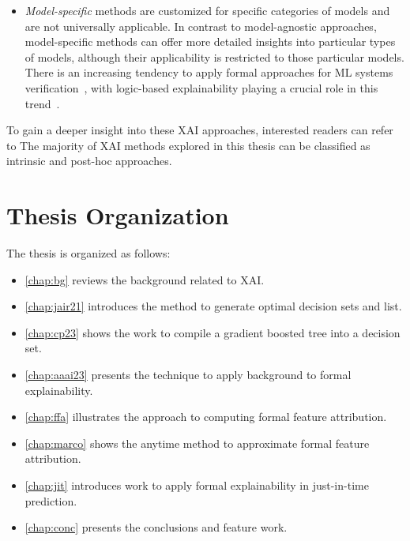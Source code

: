 \begin{itemize}
\begin{itemize}
	
	\item \emph{Model-specific} methods are customized for specific categories of models
		and are not universally applicable.
		In contrast to model-agnostic approaches, model-specific methods can offer more
		detailed insights into particular types of models, although their applicability is 
		restricted to those particular models.
		There is an increasing tendency to apply formal approaches for ML systems
		verification~\cite{sss-cacm22}, with logic-based explainability playing a crucial role in 
		this trend~\cite{ignatiev-ijcai20,msi-aaai22,darwiche-lics23,ms-rw22,msi-fai23}.
	\end{itemize}
\end{itemize}

To gain a deeper insight into these XAI approaches, interested readers can refer to
%
The majority of XAI methods explored in this thesis can be classified as intrinsic
and post-hoc approaches.





\section{Thesis Organization} \label{sec:structure}
The thesis is organized as follows:
\begin{itemize}
	\item \autoref{chap:bg} reviews the background related to XAI.
	\item \autoref{chap:jair21} introduces the method to generate optimal decision sets and list.
	\item \autoref{chap:cp23} shows the work to compile a gradient boosted tree into a
		decision set.
	\item \autoref{chap:aaai23} presents the technique to apply background to formal
		explainability.
	\item \autoref{chap:ffa}  illustrates the approach to computing formal feature attribution.
	\item \autoref{chap:marco}  shows the anytime method to approximate formal feature
		attribution.
	\item \autoref{chap:jit} introduces work to apply formal explainability in just-in-time
		prediction.
	\item \autoref{chap:conc} presents the conclusions and feature work.
\end{itemize}

